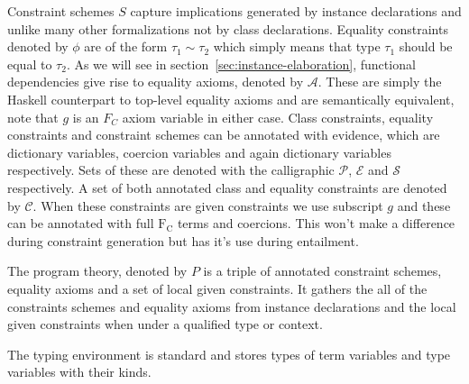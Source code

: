 Constraint schemes $S$ capture implications generated by instance declarations
and unlike many other formalizations not by class declarations. Equality
constraints denoted by $\phi$ are of the form $\tau_1 \sim \tau_2$ which simply
means that type $\tau_1$ should be equal to $\tau_2$. As we will see in
section~\ref{sec:instance-elaboration}, functional dependencies give rise to
equality axioms, denoted by $\mathcal{A}$. These are simply the Haskell
counterpart to \systemfc top-level equality axioms and are semantically
equivalent, note that $g$ is an $F_C$ axiom variable in either case. Class
constraints, equality constraints and constraint schemes can be annotated with
evidence, which are dictionary variables, coercion variables and again
dictionary variables respectively. Sets of these are denoted with the
calligraphic $\mathcal{P}$, $\mathcal{E}$ and $\mathcal{S}$ respectively. A set
of both annotated class and equality constraints are denoted by $\mathcal{C}$.
When these constraints are given constraints we use subscript $g$ and these can
be annotated with full $\text{F}_\text{C}$ terms and coercions. This won't make
a difference during constraint generation but has it's use during entailment.

The program theory, denoted by $P$ is a triple of annotated constraint schemes,
equality axioms and a set of local given constraints. It gathers the all of the
constraints schemes and equality axioms from instance declarations and the local
given constraints when under a qualified type or context.

The typing environment is standard and stores types of term variables and type
variables with their kinds.



